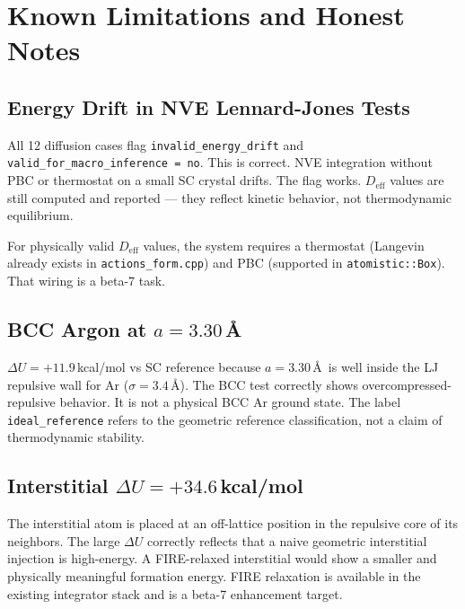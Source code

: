\documentclass[11pt,a4paper]{article}
\begin{document}
\section{Known Limitations and Honest Notes}

\subsection{Energy Drift in NVE Lennard-Jones Tests}

All 12 diffusion cases flag \texttt{invalid\_energy\_drift} and
\texttt{valid\_for\_macro\_inference = no}. This is correct. NVE integration without PBC or
thermostat on a small SC crystal drifts. The flag works. $D_\text{eff}$ values are still
computed and reported --- they reflect kinetic behavior, not thermodynamic equilibrium.

For physically valid $D_\text{eff}$ values, the system requires a thermostat (Langevin already
exists in \texttt{actions\_form.cpp}) and PBC (supported in \texttt{atomistic::Box}). That
wiring is a beta-7 task.

\subsection{BCC Argon at $a = 3.30$\,\AA}

$\Delta U = +11.9$\,kcal/mol vs SC reference because $a = 3.30$\,\AA\ is well inside the LJ
repulsive wall for Ar ($\sigma = 3.4$\,\AA). The BCC test correctly shows
overcompressed-repulsive behavior. It is not a physical BCC Ar ground state. The label
\texttt{ideal\_reference} refers to the geometric reference classification, not a claim of
thermodynamic stability.

\subsection{Interstitial $\Delta U = +34.6$\,kcal/mol}

The interstitial atom is placed at an off-lattice position in the repulsive core of its
neighbors. The large $\Delta U$ correctly reflects that a naive geometric interstitial injection
is high-energy. A FIRE-relaxed interstitial would show a smaller and physically meaningful
formation energy. FIRE relaxation is available in the existing integrator stack and is a beta-7
enhancement target.
\end{document}
